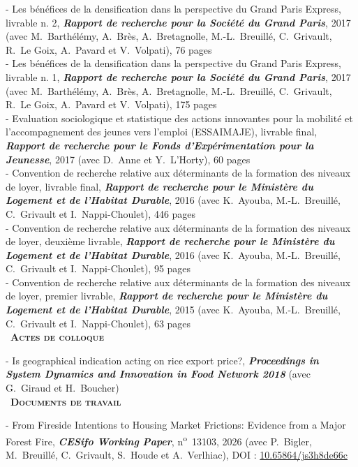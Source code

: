 \documentclass[a4paper,12pt]{article}
\newcommand{\smalltitre}[1]{%
	\noindent \textbullet~\textsc{\textbf{#1}}
	\smallskip
	}
\begin{document}
- Les bénéfices de la densification dans la perspective du Grand Paris Express, livrable n. 2, \textit{\textbf{Rapport de recherche pour la Société du Grand Paris}}, 2017 (avec M.~Barthélémy, A.~Brès, A.~Bretagnolle, M.-L.~Breuillé, C.~Grivault, R.~Le Goix, A.~Pavard et V.~Volpati), 76 pages \\
- Les bénéfices de la densification dans la perspective du Grand Paris Express, livrable n. 1, \textit{\textbf{Rapport de recherche pour la Société du Grand Paris}}, 2017 (avec M.~Barthélémy, A.~Brès, A.~Bretagnolle, M.-L.~Breuillé, C.~Grivault, R.~Le Goix, A.~Pavard et V.~Volpati), 175 pages \\
- Evaluation sociologique et statistique des actions innovantes pour la mobilité et l'accompagnement des jeunes vers l'emploi (ESSAIMAJE), livrable final, \textit{\textbf{Rapport de recherche pour le Fonds d'Expérimentation pour la Jeunesse}}, 2017 (avec D.~Anne et Y.~L'Horty), 60 pages \\
- Convention de recherche relative aux déterminants de la formation des niveaux de loyer, livrable final, \textit{\textbf{Rapport de recherche pour le Ministère du Logement et de l'Habitat Durable}}, 2016 (avec K.~Ayouba, M.-L.~Breuillé, C.~Grivault et I.~Nappi-Choulet), 446 pages \\
- Convention de recherche relative aux déterminants de la formation des niveaux de loyer, deuxième livrable, \textit{\textbf{Rapport de recherche pour le Ministère du Logement et de l'Habitat Durable}}, 2016 (avec K.~Ayouba, M.-L.~Breuillé, C.~Grivault et I.~Nappi-Choulet), 95 pages \\
- Convention de recherche relative aux déterminants de la formation des niveaux de loyer, premier livrable, \textit{\textbf{Rapport de recherche pour le Ministère du Logement et de l'Habitat Durable}}, 2015 (avec K.~Ayouba, M.-L.~Breuillé, C.~Grivault et I.~Nappi-Choulet), 63 pages \\


\smalltitre{Actes de colloque} \medskip

\noindent - Is geographical indication acting on rice export price?, \textit{\textbf{Proceedings in System Dynamics and Innovation in Food Network 2018}} (avec G.~Giraud et H.~Boucher) \\


\smalltitre{Documents de travail} \medskip

\noindent - From Fireside Intentions to Housing Market Frictions: Evidence from a Major Forest Fire, \textit{\textbf{CESifo Working Paper}}, n\textsuperscript{o}~13103, 2026 (avec P.~Bigler, M.~Breuillé, C.~Grivault, S.~Houde et A.~Verlhiac), DOI : \href{https://doi.org/10.65864/js3h8de66c}{10.65864/js3h8de66c} \\
\end{document}
